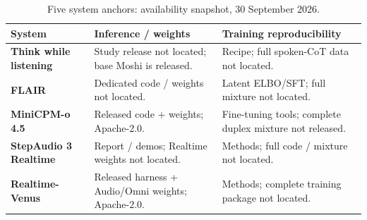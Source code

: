 \begin{table}[H]
\centering\small
\setlength{\tabcolsep}{4pt}
\setlength{\tablewidth}{\dimexpr\linewidth-4\tabcolsep\relax}
\renewcommand{\arraystretch}{1.06}
\caption{Five system anchors: availability snapshot, 30 September 2026.}
\label{tab:systems}
\begin{tabular}{@{}>{\raggedright\arraybackslash}p{0.31\tablewidth}>{\raggedright\arraybackslash}p{0.36\tablewidth}>{\raggedright\arraybackslash}p{0.33\tablewidth}@{}}
\toprule
\textbf{System} & \textbf{Inference / weights} & \textbf{Training reproducibility} \\
\midrule
\textbf{Think while listening} & Study release not located; base Moshi is released. & Recipe; full spoken-CoT data not located. \\
\addlinespace[2pt]
\textbf{FLAIR} & Dedicated code / weights not located. & Latent ELBO/SFT; full mixture not located. \\
\addlinespace[2pt]
\textbf{MiniCPM-o 4.5} & Released code + weights; Apache-2.0. & Fine-tuning tools; complete duplex mixture not released. \\
\addlinespace[2pt]
\textbf{StepAudio 3 Realtime} & Report / demos; Realtime weights not located. & Methods; full code / mixture not located. \\
\addlinespace[2pt]
\textbf{Realtime-Venus} & Released harness + Audio/Omni weights; Apache-2.0. & Methods; complete training package not located. \\
\bottomrule
\end{tabular}
\end{table}
